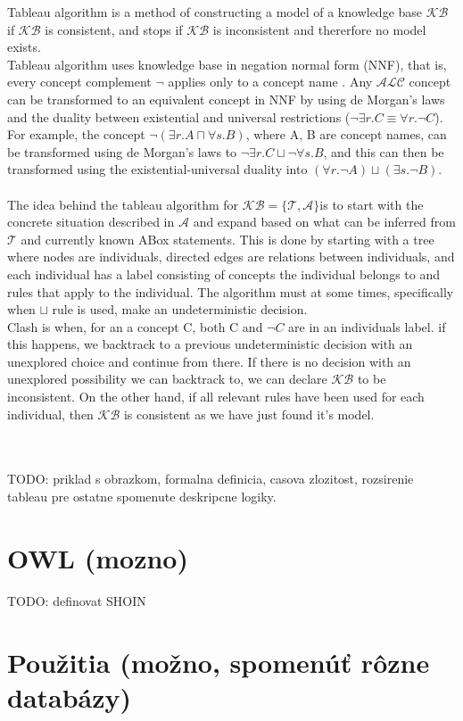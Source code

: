 Tableau algorithm is a method of constructing a model of a knowledge base $\mathcal{KB}$ if $\mathcal{KB}$ is consistent, and stops if $\mathcal{KB}$ is inconsistent and thererfore no model exists.\\
Tableau algorithm uses knowledge base in negation normal form (NNF), that is, every concept complement $\neg$ applies only to a concept name \cite{handbook2}.  Any $\mathcal{ALC}$ concept can be transformed to an equivalent concept in NNF by using de Morgan's laws and the duality between existential and universal restrictions ($\neg \exists r.C \equiv \forall r.{\neg C}$).
For example, the concept $\neg (\exists r.A \sqcap \forall s.B)$,
where A, B are concept names, can be transformed using de Morgan's laws to $\neg \exists r.C \sqcup \neg \forall s.B$, and this can then be transformed using the existential-universal duality into $(\forall r.\neg A) \sqcup (\exists s.\neg B)$.
\\ \\ 
The idea behind the tableau algorithm for $\mathcal{KB} = \{ \mathcal{T} , \mathcal{A} \} $is to start with the concrete situation described in $\mathcal{A}$ and expand based on what can be inferred from $\mathcal{T}$ and currently known ABox statements. This is done by starting with a tree where nodes are individuals, directed edges are relations between individuals, and each individual has a label consisting of concepts the individual belongs to and rules that apply to the individual. The algorithm must at some times, specifically when $\sqcup$  rule is used, make an undeterministic decision.
\\
Clash is when, for an a concept C, both C and $\neg C$ are in an individuals label. if this happens, we backtrack to a previous undeterministic decision with an unexplored choice and continue from there.    
If there is no decision with an unexplored possibility we can backtrack to, we can declare $\mathcal{KB}$ to be inconsistent. On the other hand, if all relevant rules have been used for each individual, then $\mathcal{KB}$ is consistent as we have just found it's model.


\\ \\TODO: priklad s obrazkom, formalna definicia, casova zlozitost, rozsirenie tableau pre ostatne spomenute deskripcne logiky.



\section{OWL (mozno)}
	TODO: definovat SHOIN
\section{Použitia  (možno, spomenúť rôzne databázy)}

